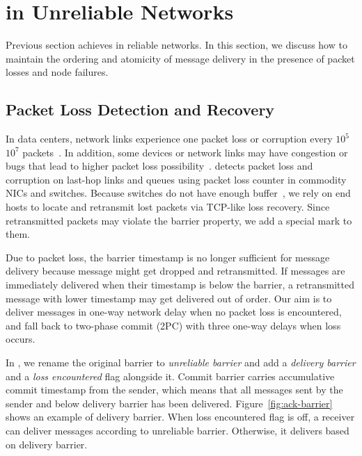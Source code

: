 \section{\sys in Unreliable Networks}
\label{sec:design-unreliable}

Previous section achieves \sys in reliable networks.
In this section, we discuss how to maintain the ordering and atomicity of message delivery in the presence of packet losses and node failures.

\subsection{Packet Loss Detection and Recovery}
\label{sec:lossy}

In data centers, network links experience one packet loss or corruption every $10^5$ \texttildelow $10^7$ packets~\cite{zhuo2017understanding}.
In addition, some devices or network links may have congestion or bugs that lead to higher packet loss possibility~\cite{guo2015pingmesh}.
\sys detects packet loss and corruption on last-hop links and queues using packet loss counter in commodity NICs and switches.
Because switches do not have enough buffer~\cite{bai2017congestion}, we rely on end hosts to locate and retransmit lost packets via TCP-like loss recovery.
Since retransmitted packets may violate the barrier property, we add a special mark to them.

Due to packet loss, the barrier timestamp is no longer sufficient for message delivery because message might get dropped and retransmitted. If messages are immediately delivered when their timestamp is below the barrier, a retransmitted message with lower timestamp may get delivered out of order.
Our aim is to deliver messages in one-way network delay when no packet loss is encountered, and fall back to two-phase commit (2PC) with three one-way delays when loss occurs.

In \sys, we rename the original barrier to \textit{unreliable barrier} and add a \textit{delivery barrier} and a \textit{loss encountered} flag alongside it.
Commit barrier carries accumulative commit timestamp from the sender, which means that all messages sent by the sender and below delivery barrier has been delivered.
Figure~\ref{fig:ack-barrier} shows an example of delivery barrier.
When loss encountered flag is off, a receiver can deliver messages according to unreliable barrier.
Otherwise, it delivers based on delivery barrier.


